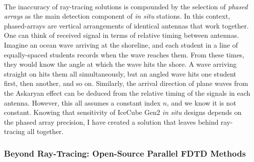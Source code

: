 \documentclass[../../../main.tex]{subfiles}
\begin{document}
\\
\vspace{0.25cm}
The inaccuracy of ray-tracing solutions is compounded by the selection of \textit{phased arrays} as the main detection component of \textit{in situ} stations.  In this context, phased-arrays are vertical arrangements of identical antennas that work together.  One can think of received signal in terms of relative timing between antennas.  Imagine an ocean wave arriving at the shoreline, and each student in a line of equally-spaced students records when the wave reaches them.  From these times, they would know the angle at which the wave hits the shore.  A wave arriving straight on hits them all simultaneously, but an angled wave hits one student first, then another, and so on.  Similarly, the arrival direction of plane waves from the Askaryan effect can be deduced from the relative timing of the signals in each antenna. However, this all assumes a constant index $n$, and we know it is not constant.  Knowing that sensitivity of IceCube Gen2 \textit{in situ} designs depends on the phased array precision, I have created a solution that leaves behind ray-tracing all together.

\subsubsection{Beyond Ray-Tracing: Open-Source Parallel FDTD Methods}
\label{sec:cem_cluster}
\end{document}
